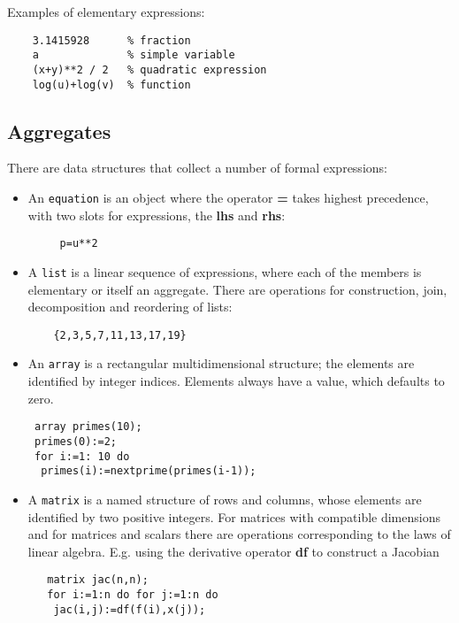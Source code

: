  
Examples of elementary expressions:
   
\begin{verbatim}
    3.1415928      % fraction
    a              % simple variable
    (x+y)**2 / 2   % quadratic expression
    log(u)+log(v)  % function
\end{verbatim}

\subsection{Aggregates}
 
There are data structures that collect a number of formal expressions:
 
\begin{itemize}
\item An {\tt equation} is an object where the operator {\bf =} takes
highest precedence, with two slots for expressions, the {\bf lhs} and
{\bf rhs}:
\begin{verbatim}
     p=u**2
\end{verbatim}

\item A {\tt list} is a linear sequence of expressions, where each of the
members is elementary or itself an aggregate.  There are operations for
construction, join, decomposition and reordering of lists:
\begin{verbatim}
    {2,3,5,7,11,13,17,19} 
\end{verbatim}

\item An {\tt array} is a rectangular multidimensional structure; the
elements are identified by integer indices.  Elements always have a value,
which defaults to zero.

\begin{verbatim}
 array primes(10);
 primes(0):=2;
 for i:=1: 10 do
  primes(i):=nextprime(primes(i-1));
\end{verbatim}

\item A {\tt matrix} is a named structure of rows and columns, whose
elements are identified by two positive integers.  For matrices with
compatible dimensions and for matrices and scalars there are operations
corresponding to the laws of linear algebra.
E.g. using the derivative operator {\bf df} to construct
a Jacobian
\begin{verbatim}
   matrix jac(n,n);
   for i:=1:n do for j:=1:n do
    jac(i,j):=df(f(i),x(j));
\end{verbatim}

\end{itemize}

